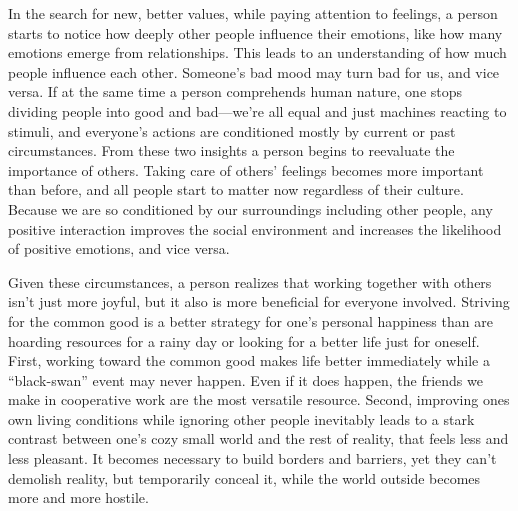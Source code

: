 \documentclass[12pt]{report}
\begin{document}
\noindent In the search for new, better values, while paying attention to feelings, a person starts to notice how deeply other people influence their emotions, like how many emotions emerge from relationships. This leads to an understanding of how much people influence each other. Someone’s bad mood may turn bad for us, and vice versa. If at the same time a person comprehends human nature, one stops dividing people into good and bad\thinspace---\thinspace we’re all equal and just machines reacting to stimuli, and everyone’s actions are conditioned mostly by current or past circumstances. From these two insights a person begins to reevaluate the importance of others. Taking care of others’ feelings becomes more important than before, and all people start to matter now regardless of their culture. Because we are so conditioned by our surroundings including other people, any positive interaction improves the social environment and increases the likelihood of positive emotions, and vice versa.

\noindent Given these circumstances, a person realizes that working together with others isn’t just more joyful, but it also is more beneficial for everyone involved. Striving for the common good is a better strategy for one’s personal happiness than are hoarding resources for a rainy day or looking for a better life just for oneself. First, working toward the common good makes life better immediately while a ``black-swan'' event may never happen. Even if it does happen, the friends we make in cooperative work are the most versatile resource. Second, improving ones own living conditions while ignoring other people inevitably leads to a stark contrast between one’s cozy small world and the rest of reality, that feels less and less pleasant. It becomes necessary to build borders and barriers, yet they can’t demolish reality, but temporarily conceal it, while the world outside becomes more and more hostile.
\end{document}
